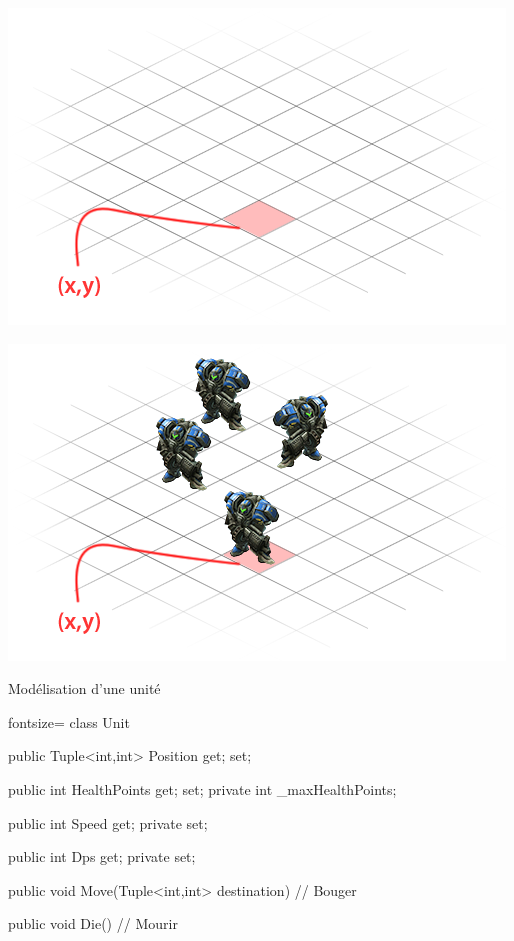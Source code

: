 \begingroup
{}
\begin{frame}
  \begin{center}
      \vspace{1.1cm}\includegraphics[scale=0.4]{img/map.png}
  \end{center}
\end{frame}

\begin{frame}
  \begin{center}
      \vspace{1.1cm}\includegraphics[scale=0.4]{img/unit.png}
  \end{center}
\end{frame}
\endgroup

\begin{frame}[fragile]
\begin{center}{\large Modélisation d'une unité}\end{center}
  \begin{csharpcode*}{fontsize=\scriptsize}
class Unit
{
    public Tuple<int,int> Position { get; set; }

    public int HealthPoints { get; set; }
    private int _maxHealthPoints;

    public int Speed { get; private set; }

    public int Dps { get; private set; }

    public void Move(Tuple<int,int> destination)
    {
        // Bouger
    }

    public void Die()
    {
        // Mourir
    }
}
  \end{csharpcode*}
\end{frame}

